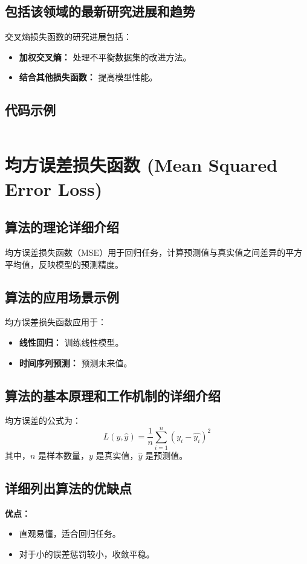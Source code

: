 \subsection*{包括该领域的最新研究进展和趋势}
交叉熵损失函数的研究进展包括：
\begin{itemize}
    \item \textbf{加权交叉熵：} 处理不平衡数据集的改进方法。
    \item \textbf{结合其他损失函数：} 提高模型性能。
\end{itemize}
\subsection*{代码示例}
\begin{lstlisting}

\end{lstlisting}


\section{均方误差损失函数 (Mean Squared Error Loss)}
\subsection*{算法的理论详细介绍}
均方误差损失函数（MSE）用于回归任务，计算预测值与真实值之间差异的平方平均值，反映模型的预测精度。

\subsection*{算法的应用场景示例}
均方误差损失函数应用于：
\begin{itemize}
    \item \textbf{线性回归：} 训练线性模型。
    \item \textbf{时间序列预测：} 预测未来值。
\end{itemize}

\subsection*{算法的基本原理和工作机制的详细介绍}
均方误差的公式为：
\[
    L(y, \hat{y}) = \frac{1}{n} \sum_{i=1}^{n} (y_i - \hat{y_i})^2
\]
其中，\(n\) 是样本数量，\(y\) 是真实值，\(\hat{y}\) 是预测值。

\subsection*{详细列出算法的优缺点}
\textbf{优点：}
\begin{itemize}
    \item 直观易懂，适合回归任务。
    \item 对于小的误差惩罚较小，收敛平稳。
\end{itemize}


